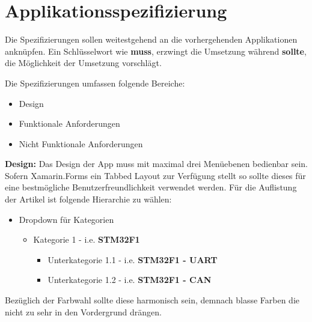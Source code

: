 	\newpage

\section{Applikationsspezifizierung}
\label{sec:mckspecs}

	Die Spezifizierungen sollen weitestgehend an die vorhergehenden Applikationen anknüpfen. Ein Schlüsselwort wie \textbf{muss}, erzwingt die Umsetzung während \textbf{sollte}, die Möglichkeit der Umsetzung vorschlägt.

	Die Spezifizierungen umfassen folgende Bereiche:
	\begin{itemize}
		\setlength\itemsep{0em}
		\item Design
		\item Funktionale Anforderungen
		\item Nicht Funktionale Anforderungen
	\end{itemize}

	\textbf{Design:} Das Design der App muss mit maximal drei Menüebenen bedienbar sein. Sofern Xamarin.Forms ein Tabbed Layout zur Verfügung stellt so sollte dieses für eine bestmögliche Benutzerfreundlichkeit verwendet werden. Für die Auflistung der Artikel ist folgende Hierarchie zu wählen:
	\begin{itemize}
		\setlength\itemsep{0em}
		\item Dropdown für Kategorien
		\begin{itemize}
			\setlength\itemsep{0em}
			\item Kategorie 1 - i.e. \textbf{STM32F1}
			\begin{itemize}
				\setlength\itemsep{0em}
				\item Unterkategorie 1.1 - i.e. \textbf{STM32F1 - UART}
				\item Unterkategorie 1.2 - i.e. \textbf{STM32F1 - CAN}
			\end{itemize}
		\end{itemize}
	\end{itemize}
	Bezüglich der Farbwahl sollte diese harmonisch sein, demnach blasse Farben die nicht zu sehr in den Vordergrund drängen.

